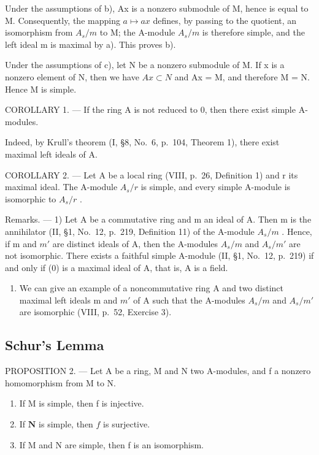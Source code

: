 Under the assumptions of b), Ax is a nonzero submodule of M, hence is equal to M. Consequently, the mapping \(a \mapsto ax\) defines, by passing to the quotient, an isomorphism from \(A_{s}/m\) to M; the A-module \(A_{s}/m\) is therefore simple, and the left ideal m is maximal by a). This proves b).

Under the assumptions of c), let N be a nonzero submodule of M. If x is a nonzero element of N, then we have \(Ax \subset N\) and Ax = M, and therefore M = N. Hence M is simple.

COROLLARY 1. --- If the ring A is not reduced to 0, then there exist simple A-modules.

Indeed, by Krull's theorem (I, §8, No.~6, p.~104, Theorem 1), there exist maximal left ideals of A.

COROLLARY 2. --- Let A be a local ring (VIII, p.~26, Definition 1) and r its maximal ideal. The A-module \(A_{s}/r\) is simple, and every simple A-module is isomorphic to \(A_{s}/r\) .

Remarks. --- 1) Let A be a commutative ring and m an ideal of A. Then m is the annihilator (II, §1, No.~12, p.~219, Definition 11) of the A-module \(A_{s}/m\) . Hence, if m and \(m'\) are distinct ideals of A, then the A-modules \(A_{s}/m\) and \(A_{s}/m'\) are not isomorphic. There exists a faithful simple A-module (II, §1, No.~12, p.~219) if and only if (0) is a maximal ideal of A, that is, A is a field.

\begin{enumerate}
\def\labelenumi{\arabic{enumi})}
\setcounter{enumi}{1}
\tightlist
\item
  We can give an example of a noncommutative ring A and two distinct maximal left ideals m and \(m'\) of A such that the A-modules \(A_{s}/m\) and \(A_{s}/m'\) are isomorphic (VIII, p.~52, Exercise 3).
\end{enumerate}

\subsection{Schur's Lemma}

PROPOSITION 2. --- Let A be a ring, M and N two A-modules, and f a nonzero homomorphism from M to N.

\begin{enumerate}
\def\labelenumi{\alph{enumi})}
\item
  If M is simple, then f is injective.
\item
  If \(\mathbf{N}\) is simple, then \(f\) is surjective.
\item
  If M and N are simple, then f is an isomorphism.
\end{enumerate}

